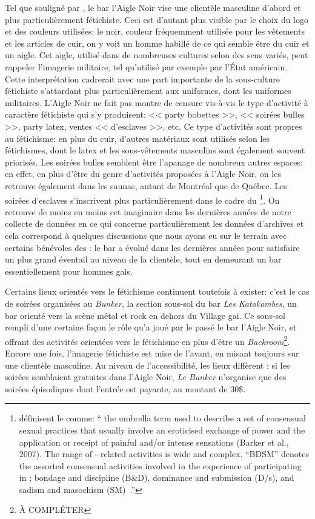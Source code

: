 Tel que souligné par \citet{Giraud2013a}, le bar l'Aigle Noir vise une clientèle masculine d'abord et plus particulièrement fétichiste. 
Ceci est d'autant plus visible par le choix du logo et des couleurs utilisées: le noir, couleur fréquemment utilisée pour les vêtements et les articles de cuir, on y voit un homme habillé de ce qui semble être du cuir et un aigle. 
Cet aigle, utilisé dans de nombreuses cultures selon des sens variés, peut rappeler l'imagerie militaire, tel qu'utilisé par exemple par l'État américain. 
Cette interprétation cadrerait avec une part importante de la sous-culture fétichiste s'attardant plus particulièrement aux uniformes, dont les uniformes militaires. 
L'Aigle Noir ne fait pas montre de censure vis-à-vis le type d'activité à caractère fétichiste qui s'y produisent: << party bobettes >>, << soirées bulles >>, party latex, ventes << d'esclaves >>, etc. 
Ce type d'activités sont propres au fétichisme: en plus du cuir, d'autres matériaux sont utilisés selon les fétichismes, dont le latex et les sous-vêtements masculins sont également souvent priorisés. 
Les soirées bulles semblent être l'apanage de nombreux autres espaces: en effet, en plus d'être du genre d'activités proposées à l'Aigle Noir, on les retrouve également dans les saunas, autant de Montréal que de Québec. 
Les soirées d'esclaves s'inscrivent plus particulièrement dans le cadre du \bdsm{}\footnote{\citeauthor{ Turley2015} définisent le \bdsm{} comme: \foreignquote{ english}{\textelp{} the umbrella term used to describe a set of consensual sexual practices that usually involve an eroticised exchange of power and the application or receipt of painful and/or intense sensations (Barker et al., 2007). 
The range of \bdsm{}- related activities is wide and complex. 
“BDSM” denotes the assorted consensual activities involved in the experience of participating in \bdsm{}; bondage and discipline (B\&D), dominance and submission (D/s), and sadism and masochism (SM)~\citeyearpar[24]{Turley2015}.}}. 
On retrouve de moins en moins cet imaginaire dans les dernières années de notre collecte de données en ce qui concerne particulièrement les données d'archives et cela correspond à quelques discussions que nous ayons eu sur le terrain avec certains bénévoles des \agq{}: le bar a évolué dans les dernières années pour satisfaire un plus grand éventail au niveau de la clientèle, tout en demeurant un bar essentiellement pour hommes gais. 

Certains lieux orientés vers le fétichisme continuent toutefois à exister: c'est le cas de soirées organisées au \emph{Bunker}, la section sous-sol du bar \emph{Les Katakombes}, un bar orienté vers la scène métal et rock en dehors du Village gai. 
Ce sous-sol rempli d'une certaine façon le rôle qu'a joué par le passé le bar l'Aigle Noir, et offrant des activités orientées vers le fétichisme en plus d'être un \emph{Backroom}\footnote{À COMPLÉTER}. 
Encore une fois, l'imagerie fétichiste est mise de l'avant, en misant toujours sur une clientèle masculine. 
Au niveau de l'accessibilité, les lieux diffèrent : si les soirées semblaient gratuites dans l'Aigle Noir, \emph{Le Bunker} n'organise que des soirées épisodiques dont l'entrée est payante, au montant de 30\$. 

